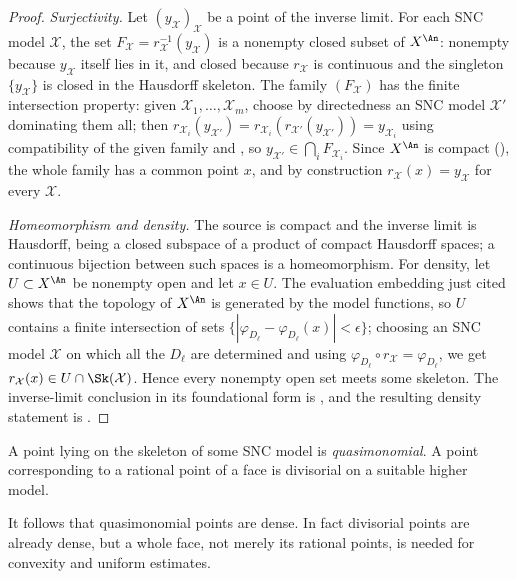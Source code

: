 \begin{proof}
\emph{Surjectivity.} Let $(y_{\mathcal X})_{\mathcal X}$ be a point of the
inverse limit. For each SNC model $\mathcal X$, the set
$F_{\mathcal X}=r_{\mathcal X}^{-1}(y_{\mathcal X})$ is a nonempty closed
subset of $X^{\An}$: nonempty because $y_{\mathcal X}$ itself lies in
it, and closed because $r_{\mathcal X}$ is continuous and the singleton
$\{y_{\mathcal X}\}$ is closed in the Hausdorff skeleton. The family
$(F_{\mathcal X})$ has the finite intersection property: given
$\mathcal X_1,\ldots,\mathcal X_m$, choose by directedness an SNC model
$\mathcal X'$ dominating them all; then
$r_{\mathcal X_i}(y_{\mathcal X'})
 =r_{\mathcal X_i}(r_{\mathcal X'}(y_{\mathcal X'}))
 =y_{\mathcal X_i}$ using compatibility of the given family and
, so $y_{\mathcal X'}\in\bigcap_iF_{\mathcal
X_i}$. Since $X^{\An}$ is compact (), the
whole family has a common point $x$, and by construction
$r_{\mathcal X}(x)=y_{\mathcal X}$ for every $\mathcal X$.

\emph{Homeomorphism and density.} The source is compact and the inverse
limit is Hausdorff, being a closed subspace of a product of compact
Hausdorff spaces; a continuous bijection between such spaces is a
homeomorphism. For density, let $U\subset X^{\An}$ be nonempty open and
let $x\in U$. The evaluation embedding just cited shows that the topology
of $X^{\An}$ is generated by the model functions, so $U$ contains a finite
intersection of sets $\{|\varphi_{D_\ell}-\varphi_{D_\ell}(x)|<\epsilon\}$;
choosing an SNC model $\mathcal X$ on which all the $D_\ell$ are
determined and using $\varphi_{D_\ell}\circ r_{\mathcal X}
=\varphi_{D_\ell}$, we get $r_{\mathcal X}(x)\in U\cap\Sk(\mathcal X)$.
Hence every nonempty open set meets some skeleton.  The inverse-limit
conclusion in its foundational form is \cite[Corollary~3.2]{BFJ16}, and
the resulting density statement is \cite[Corollary~3.9]{BFJ16}.
\end{proof}

\begin{definition}
\label{def:skeleton-quasimonomial}
A point lying on the skeleton of some SNC model is
\emph{quasimonomial}. A point corresponding to a rational point of a face
is divisorial on a suitable higher model.
\end{definition}

It follows that quasimonomial points are dense. In fact divisorial points are
already dense, but a whole face, not merely its rational points, is needed
for convexity and uniform estimates.

